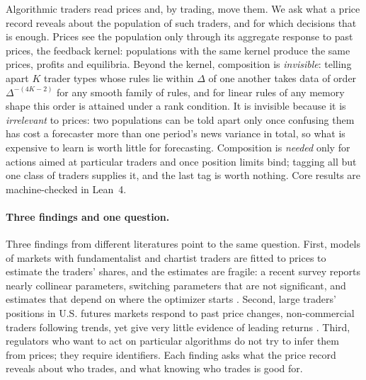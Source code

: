 
\noindent Algorithmic traders read prices and, by trading, move them. We ask what a price record reveals about the population of such traders, and for which decisions that is enough. Prices see the population only through its aggregate response to past prices, the feedback kernel: populations with the same kernel produce the same prices, profits and equilibria. Beyond the kernel, composition is \emph{invisible}: telling apart $K$ trader types whose rules lie within $\Delta$ of one another takes data of order $\Delta^{-(4K-2)}$ for any smooth family of rules, and for linear rules of any memory shape this order is attained under a rank condition. It is invisible because it is \emph{irrelevant} to prices: two populations can be told apart only once confusing them has cost a forecaster more than one period's news variance in total, so what is expensive to learn is worth little for forecasting. Composition is \emph{needed} only for actions aimed at particular traders and once position limits bind; tagging all but one class of traders supplies it, and the last tag is worth nothing. Core results are machine-checked in Lean~4.

\paragraph{Three findings and one question.} Three findings from different literatures point to the same question. First, models of markets with fundamentalist and chartist traders \citep{brock1998,hommes2006} are fitted to prices to estimate the traders' shares, and the estimates are fragile: a recent survey reports nearly collinear parameters, switching parameters that are not significant, and estimates that depend on where the optimizer starts \citep{lux2018}. Second, large traders' positions in U.S. futures markets respond to past price changes, non-commercial traders following trends, yet give very little evidence of leading returns \citep{sanders2009}. Third, regulators who want to act on particular algorithms do not try to infer them from prices; they require identifiers. Each finding asks what the price record reveals about who trades, and what knowing who trades is good for.

